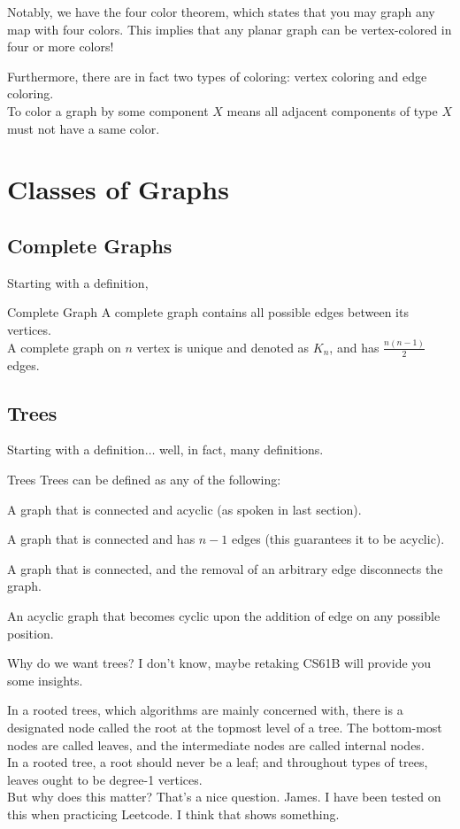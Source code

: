 Notably, we have the four color theorem, which states that you may graph any map with four colors. This implies that any planar graph can be vertex-colored in four or more colors!

Furthermore, there are in fact two types of coloring: vertex coloring and edge coloring. \\
To color a graph by some component $X$ means all adjacent components of type $X$ must not have a same color.

\section{Classes of Graphs}

\subsection{Complete Graphs}
Starting with a definition,
\begin{ln-define}{Complete Graph}{}
    A complete graph contains all possible edges between its vertices. \\
    A complete graph on $n$ vertex is unique and denoted as $K_n$, and has $\frac{n(n-1)}{2} $edges.
\end{ln-define}

\subsection{Trees}
Starting with a definition$\dots$ well, in fact, many definitions.
\begin{ln-define}{Trees}{}
    Trees can be defined as any of the following:
    \begin{bindenum}
        \item A graph that is connected and acyclic (as spoken in last section).
        \item A graph that is connected and has $n - 1$ edges (this guarantees it to be acyclic).
        \item A graph that is connected, and the removal of an arbitrary edge disconnects the graph.
        \item An acyclic graph that becomes cyclic upon the addition of edge on any possible position.
    \end{bindenum}
\end{ln-define}
Why do we want trees? I don't know, maybe retaking CS61B will provide you some insights.

In a rooted trees, which algorithms are mainly concerned with, there is a designated node called the root at the topmost level of a tree. The bottom-most nodes are called leaves, and the intermediate nodes are called internal nodes. \\
In a rooted tree, a root should never be a leaf; and throughout types of trees, leaves ought to be degree-1 vertices. \\
But why does this matter? That's a nice question. James. I have been tested on this when practicing Leetcode. I think that shows something.

